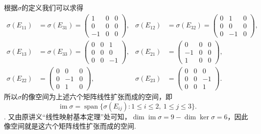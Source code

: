 \documentclass[12pt,fontset=fandol]{ctexart}
\begin{document}
\begin{solve}
    根据$\sigma$的定义我们可以求得
    \begin{align*}
        \sigma(E_{11})&=\sigma(E_{31})=\begin{pmatrix}
            1 & 0 & 0 \\ 0 & 0 & 0 \\ -1 & 0 & 0
        \end{pmatrix}, &
        \sigma(E_{12})&=\sigma(E_{32})=\begin{pmatrix}
            0 & 1 & 0 \\ 0 & 0 & 0 \\ 0 & -1 & 0
        \end{pmatrix}, \\
        \sigma(E_{13})&=\sigma(E_{33})=\begin{pmatrix}
            0 & 0 & 1 \\ 0 & 0 & 0 \\ 0 & 0 & -1
        \end{pmatrix}, &
        \sigma(E_{21})&=\begin{pmatrix}
            0 & 0 & 0 \\ -1 & 0 & 0 \\ 1 & 0 & 0
        \end{pmatrix}, \\
        \sigma(E_{22})&=\begin{pmatrix}
            0 & 0 & 0 \\ 0 & -1 & 0 \\ 0 & 1 & 0
        \end{pmatrix}, &
        \sigma(E_{23})&=\begin{pmatrix}
            0 & 0 & 0 \\ 0 & 0 & -1 \\ 0 & 0 & 1
        \end{pmatrix}.
    \end{align*}
    所以$\sigma$的像空间为上述六个矩阵线性扩张而成的空间，即\[\operatorname{im}\sigma=\operatorname{span}\{\sigma(E_{ij}):1\le i\le2,\ 1\le j\le3\}.\]. 又由原讲义“线性映射基本定理”处可知，$\dim\operatorname{im}\sigma=9-\dim\ker\sigma=6$，因此像空间就是这六个矩阵线性扩张而成的空间.
\end{solve}
\end{document}
